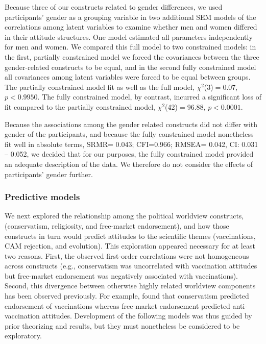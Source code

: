 \documentclass[fignum,man]{apa}\usepackage[]{graphicx}\usepackage[]{color}
\begin{document}
Because three of our constructs related to gender
differences, we used participants' gender as a
grouping variable in two additional
SEM models of the correlations among latent variables
to examine whether men and women
differed in their attitude structures.
One model estimated all parameters independently for
men and women. 
We compared this full model to two constrained
models: in the first, partially constrained model
we forced the covariances between the three gender-related
constructs to be equal, and in the second fully constrained model 
all covariances
among latent variables were forced to be equal between groups.
The partially constrained model fit as well as the 
full model, $\chi^2$(3)$=$0.07, 
$p < 0.9950$.
The fully constrained model, by contrast, 
incurred a significant loss of fit compared to the partially constrained model, 
$\chi^2$(42)$=$96.88, 
$p < 0.0001$.

Because the associations among the gender related constructs did not differ 
with gender of the participants, 
and because the 
fully constrained model nonetheless
fit well in absolute terms, SRMR=
0.043; 
CFI=0.966; RMSEA= 
0.042, CI:
0.031 -- 
0.052,
we decided that for our purposes, the fully constrained model provided an adequate
description of the data. We therefore  
do not consider the
effects of participants' gender further.  

\subsubsection{Predictive models}

We next explored the relationship among the political worldview constructs,
(conservatism, religiosity, and free-market endorsement), and how those constructs
in turn would predict attitudes to the scientific themes (vaccinations, CAM rejection, and
evolution). This exploration appeared necessary for at least two reasons. First, the observed first-order
correlations were not homogeneous across constructs (e.g., conservatism was uncorrelated with
vaccination attitudes but free-market endorsement was negatively associated with vaccinations).
Second, this divergence between otherwise highly related worldview components 
has been observed previously. For example,  found that conservatism
predicted endorsement of vaccinations whereas free-market endorsement predicted anti-vaccination
attitudes. Development of the following models was thus guided by prior theorizing and results, but they 
must nonetheless 
be considered to be exploratory.
 
\end{document}
